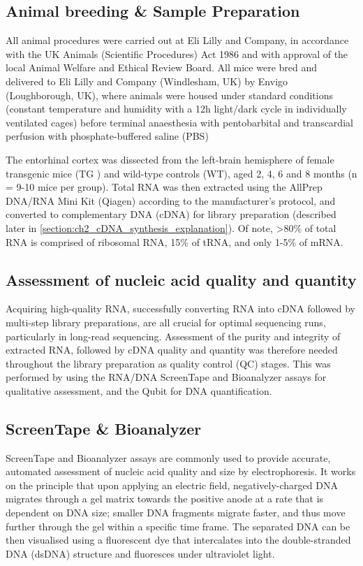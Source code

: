 \subsection{Animal breeding \& Sample Preparation}
All animal procedures were carried out at Eli Lilly and Company, in accordance with the UK Animals (Scientific Procedures) Act 1986 and with approval of the local Animal Welfare and Ethical Review Board. All mice were bred and delivered to Eli Lilly and Company (Windlesham, UK) by Envigo (Loughborough, UK), where animals were housed under standard conditions (constant temperature and humidity with a 12h light/dark cycle in individually ventilated cages) before terminal anaesthesia with pentobarbital and transcardial perfusion with phosphate-buffered saline (PBS)\cite{Castanho2020}

The entorhinal cortex was dissected from the left-brain hemisphere of female transgenic mice (TG ) and wild-type controls (WT), aged 2, 4, 6 and 8 months (n = 9-10 mice per group). Total RNA was then extracted\cite{Castanho2020} using the AllPrep DNA/RNA Mini Kit (Qiagen) according to the manufacturer's protocol, and converted to complementary DNA (cDNA) for library preparation (described later in \cref{section:ch2_cDNA_synthesis_explanation}). Of note, >80\% of total RNA is comprised of ribosomal RNA, 15\% of tRNA, and only 1-5\% of mRNA. 

\subsection{Assessment of nucleic acid quality and quantity}
Acquiring high-quality RNA, successfully converting RNA into cDNA followed by multi-step library preparations, are all crucial for optimal sequencing runs, particularly in long-read sequencing. Assessment of the purity and integrity of extracted RNA, followed by cDNA quality and quantity was therefore needed throughout the library preparation as quality control (QC) stages. This was performed by using the RNA/DNA ScreenTape and Bioanalyzer assays for qualitative assessment, and the Qubit for DNA quantification. 


\subsection{ScreenTape \& Bioanalyzer}
\label{section:ch2_bioanalyzer} 
ScreenTape and Bioanalyzer assays are commonly used to provide accurate, automated assessment of nucleic acid quality and size by electrophoresis. It works on the principle that upon applying an electric field, negatively-charged DNA migrates through a gel matrix towards the positive anode at a rate that is dependent on DNA size; smaller DNA fragments migrate faster, and thus move further through the gel within a specific time frame. The separated DNA can be then visualised using a fluorescent dye that intercalates into the double-stranded DNA (dsDNA) structure and fluoresces under ultraviolet light. 

